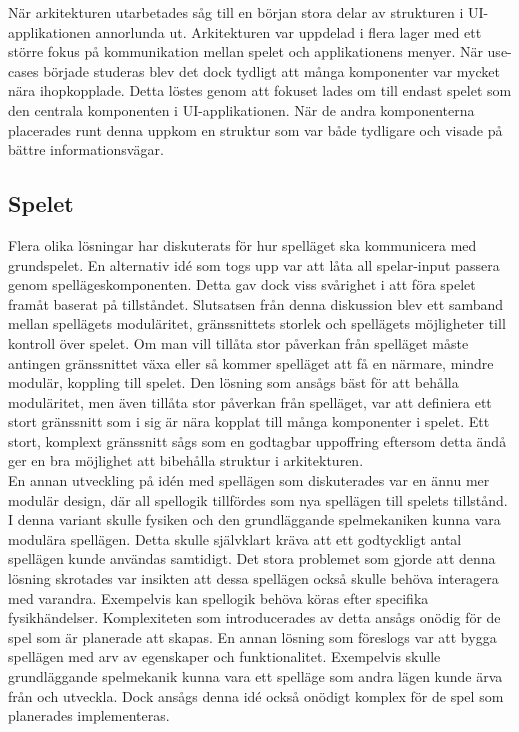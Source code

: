 När arkitekturen utarbetades såg till en början stora delar av strukturen i UI-applikationen annorlunda ut. Arkitekturen var uppdelad i flera lager med ett större fokus på kommunikation mellan spelet och applikationens menyer. När use-cases började studeras blev det dock tydligt att många komponenter var mycket nära ihopkopplade. Detta löstes genom att fokuset lades om till endast spelet som den centrala komponenten i UI-applikationen. När de andra komponenterna placerades runt denna uppkom en struktur som var både tydligare och visade på bättre informationsvägar.\\

\subsection{Spelet}
Flera olika lösningar har diskuterats för hur spelläget ska kommunicera med grundspelet. En alternativ idé som togs upp var att låta all spelar-input passera genom spellägeskomponenten. Detta gav dock viss svårighet i att föra spelet framåt baserat på tillståndet. Slutsatsen från denna diskussion blev ett samband mellan spellägets moduläritet, gränssnittets storlek och spellägets möjligheter till kontroll över spelet. Om man vill tillåta stor påverkan från spelläget måste antingen gränssnittet växa eller så kommer spelläget att få en närmare, mindre modulär, koppling till spelet. Den lösning som ansågs bäst för att behålla moduläritet, men även tillåta stor påverkan från spelläget, var att definiera ett stort gränssnitt som i sig är nära kopplat till många komponenter i spelet. Ett stort, komplext gränssnitt sågs som en godtagbar uppoffring eftersom detta ändå ger en bra möjlighet att bibehålla struktur i arkitekturen.\\

En annan utveckling på idén med spellägen som diskuterades var en ännu mer modulär design, där all spellogik tillfördes som nya spellägen till spelets tillstånd. I denna variant skulle fysiken och den grundläggande spelmekaniken kunna vara modulära spellägen. Detta skulle självklart kräva att ett godtyckligt antal spellägen kunde användas samtidigt. Det stora problemet som gjorde att denna lösning skrotades var insikten att dessa spellägen också skulle behöva interagera med varandra. Exempelvis kan spellogik behöva köras efter specifika fysikhändelser. Komplexiteten som introducerades av detta ansågs onödig för de spel som är planerade att skapas. En annan lösning som föreslogs var att bygga spellägen med arv av egenskaper och funktionalitet. Exempelvis skulle grundläggande spelmekanik kunna vara ett spelläge som andra lägen kunde ärva från och utveckla. Dock ansågs denna idé också onödigt komplex för de spel som planerades implementeras.\\

